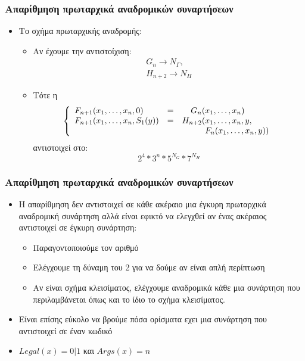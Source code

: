 \documentclass{beamer}
\begin{document}
\begin{frame}
  \frametitle{Απαρίθμηση πρωταρχικά αναδρομικών συναρτήσεων}
  \begin{itemize}
  \item Το σχήμα πρωταρχικής αναδρομής:
    \begin{itemize}
    \item Αν έχουμε την αντιστοίχιση:
      $$
      \begin{array}{l}
        G_n \rightarrow N_Γ,\\
        H_{n+2} \rightarrow N_H
      \end{array}
      $$
    \item Τότε η 
      $$
      \left\{
      \begin{array}{llr@{}l}
        F_{n+1}(x_1,\ldots,x_n, 0)     &=&    G_n(&x_1,\ldots,x_n) \\
        F_{n+1}(x_1,\ldots,x_n, S_1(y))&=&H_{n+2}(&x_1,\ldots,x_n, y ,\\
        & &        &F_n(x_1,\ldots,x_n, y))
      \end{array}
      \right.
      $$
      αντιστοιχεί στο:
      $$ 2^4*3^n*5^{N_G}*7^{N_H} $$
    \end{itemize}                   
  \end{itemize}
\end{frame}

\begin{frame}
  \frametitle{Απαρίθμηση πρωταρχικά αναδρομικών συναρτήσεων}
  \begin{itemize}
  \item Η απαρίθμηση δεν αντιστοιχεί σε κάθε ακέραιο μια έγκυρη
    πρωταρχικά αναδρομική συνάρτηση αλλά είναι εφικτό να ελεγχθεί αν
    ένας ακέραιος αντιστοιχεί σε έγκυρη συνάρτηση: \pause
    \begin{itemize}
    \item Παραγοντοποιούμε τον αριθμό
    \item Ελέγχουμε τη δύναμη του 2 για να δούμε αν είναι απλή
      περίπτωση
    \item Αν είναι σχήμα κλεισίματος, ελέγχουμε αναδρομικά κάθε μια
      συνάρτηση που περιλαμβάνεται όπως και το ίδιο το σχήμα
      κλεισίματος.
    \end{itemize}
    \pause
  \item Είναι επίσης εύκολο να βρούμε πόσα ορίσματα εχει μια συνάρτηση
    που αντιστοιχεί σε έναν κωδικό
  \item $Legal(x)=0|1$ και $Args(x)=n$
  \end{itemize}
\end{frame}
\end{document}
